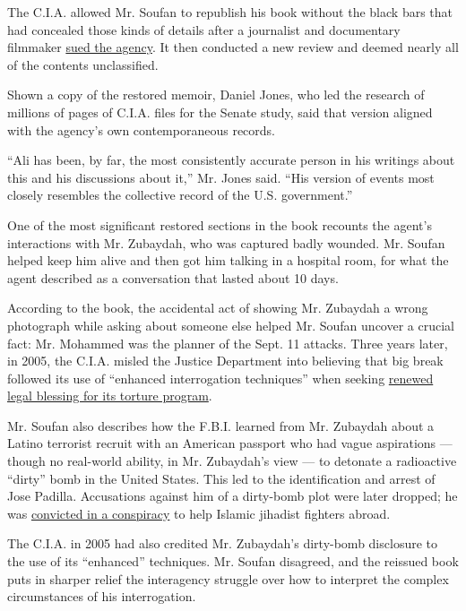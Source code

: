 The C.I.A. allowed Mr. Soufan to republish his book without the black
bars that had concealed those kinds of details after a journalist and
documentary filmmaker
\href{https://pacer-documents.s3.amazonaws.com/119/505795/127123716189.pdf}{sued
the agency}. It then conducted a new review and deemed nearly all of the
contents unclassified.

Shown a copy of the restored memoir, Daniel Jones, who led the research
of millions of pages of C.I.A. files for the Senate study, said that
version aligned with the agency's own contemporaneous records.

``Ali has been, by far, the most consistently accurate person in his
writings about this and his discussions about it,'' Mr. Jones said.
``His version of events most closely resembles the collective record of
the U.S. government.''

One of the most significant restored sections in the book recounts the
agent's interactions with Mr. Zubaydah, who was captured badly wounded.
Mr. Soufan helped keep him alive and then got him talking in a hospital
room, for what the agent described as a conversation that lasted about
10 days.

According to the book, the accidental act of showing Mr. Zubaydah a
wrong photograph while asking about someone else helped Mr. Soufan
uncover a crucial fact: Mr. Mohammed was the planner of the Sept. 11
attacks. Three years later, in 2005, the C.I.A. misled the Justice
Department into believing that big break followed its use of ``enhanced
interrogation techniques'' when seeking
\href{https://www.justice.gov/sites/default/files/olc/legacy/2013/10/21/memo-bradbury2005.pdf}{renewed
legal blessing for its torture program}.

Mr. Soufan also describes how the F.B.I. learned from Mr. Zubaydah about
a Latino terrorist recruit with an American passport who had vague
aspirations --- though no real-world ability, in Mr. Zubaydah's view ---
to detonate a radioactive ``dirty'' bomb in the United States. This led
to the identification and arrest of Jose Padilla. Accusations against
him of a dirty-bomb plot were later dropped; he was
\href{https://www.nytimes3xbfgragh.onion/2007/08/17/us/17padilla.html}{convicted
in a conspiracy} to help Islamic jihadist fighters abroad.

The C.I.A. in 2005 had also credited Mr. Zubaydah's dirty-bomb
disclosure to the use of its ``enhanced'' techniques. Mr. Soufan
disagreed, and the reissued book puts in sharper relief the interagency
struggle over how to interpret the complex circumstances of his
interrogation.

